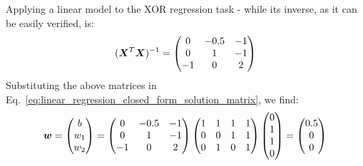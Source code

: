 \begin{frame}[t,allowframebreaks]{
    Applying a linear model to the XOR regression task -}
    while its inverse, as it can be easily verified, is:\\
    \vspace{-0.3cm}
    \begin{equation}
        (\boldsymbol{X}^T \boldsymbol{X})^{-1} = 
        \begin{pmatrix}
            0 & -0.5 & -1 \\
            0 &  1   & -1 \\
           -1 &  0   &  2 \\
        \end{pmatrix} 
    \end{equation}        
    \vspace{-0.5cm}
    Substituting the above matrices 
    in Eq.~\ref{eq:linear_regression_closed_form_solution_matrix}, we find:\\
    \begin{equation}
        \boldsymbol{w} 
        = 
        \begin{pmatrix}
            b   \\
            w_1 \\
            w_2 \\
        \end{pmatrix} 
        =
        \begin{pmatrix}
            0 & -0.5 & -1 \\
            0 &  1   & -1 \\
           -1 &  0   &  2 \\
        \end{pmatrix} 
        \begin{pmatrix}
            1 & 1 & 1 & 1 \\
            0 & 0 & 1 & 1 \\
            0 & 1 & 0 & 1 \\
        \end{pmatrix} 
        \begin{pmatrix}
            0 \\
            1 \\
            1 \\
            0 \\
        \end{pmatrix} 
        =
        \begin{pmatrix}
            0.5 \\
            0 \\
            0 \\
        \end{pmatrix} 
        \label{eq:learn_xor_linear_model_weights}
    \end{equation}        


\end{frame}
